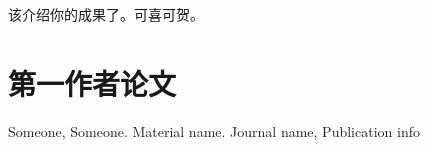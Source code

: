 \begin{publications}

该介绍你的成果了。可喜可贺。

\section*{第一作者论文}

\begin{enumerate}[label={[\arabic*]}]
\item Someone, Someone. Material name. Journal name, Publication info
\end{enumerate}

\end{publications}
